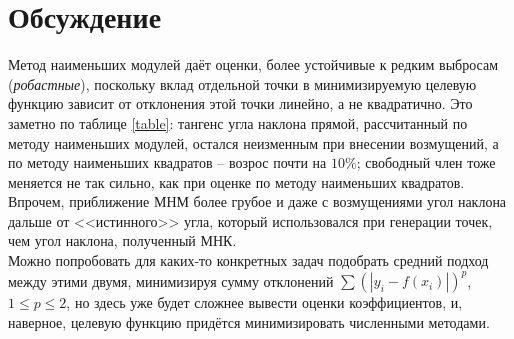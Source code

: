 \documentclass[main.tex]{subfiles}
\begin{document}
\section{Обсуждение}
Метод наименьших модулей даёт оценки, более устойчивые к редким выбросам (\emph{робастные}), поскольку вклад отдельной точки в минимизируемую целевую функцию зависит от отклонения этой точки линейно, а не квадратично. Это заметно по таблице \ref{table}: тангенс угла наклона прямой, рассчитанный по методу наименьших модулей, остался неизменным при внесении возмущений, а по методу наименьших квадратов -- возрос почти на $10\%$; свободный член тоже меняется не так сильно, как при оценке по методу наименьших квадратов. Впрочем, приближение МНМ более грубое и даже с возмущениями угол наклона дальше от <<истинного>> угла, который использовался при генерации точек, чем угол наклона, полученный МНК.\\
Можно попробовать для каких-то конкретных задач подобрать средний подход между этими двумя, минимизируя сумму отклонений $\sum(|y_i - f(x_i)|)^p$, $1 \le p \le 2$, но здесь уже будет сложнее вывести оценки коэффициентов, и, наверное, целевую функцию придётся минимизировать численными методами.
\end{document}
